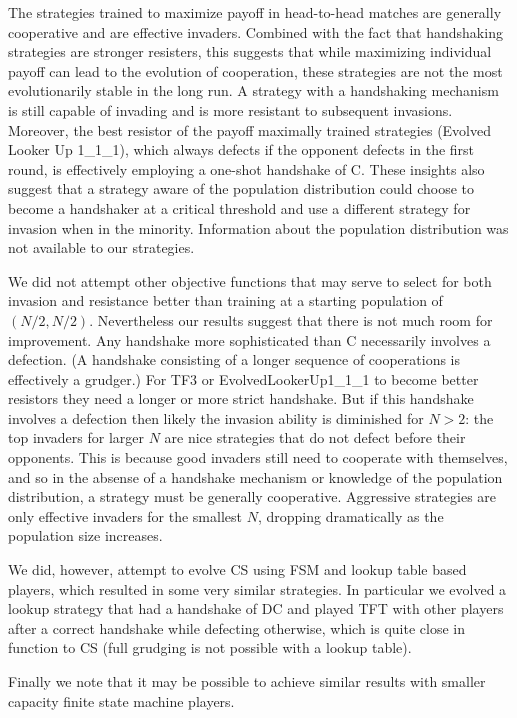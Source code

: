 \documentclass{article}
\begin{document}
The strategies trained to maximize payoff in head-to-head matches are generally
cooperative and are effective invaders.
Combined with the fact that handshaking strategies are stronger resisters,
this suggests that while maximizing individual payoff can lead to the evolution
of cooperation, these strategies are not the most evolutionarily stable
in the long run. A strategy with a handshaking mechanism is still capable of
invading and is more resistant to subsequent invasions. Moreover, the
best resistor of the payoff maximally trained strategies (Evolved Looker Up
1\_1\_1),
which always defects if the opponent defects in the first round, is effectively
employing a one-shot handshake of C. These insights also suggest that a strategy
aware of the population distribution could choose to become a handshaker at
a critical threshold and use a different strategy for invasion when in the
minority. Information about the population distribution was not available
to our strategies.

We did not attempt other objective functions that may serve to select for both
invasion and resistance better than training at a starting population of
$(N/2, N/2)$. Nevertheless our results suggest that there is not much room for
improvement. Any handshake more sophisticated than C necessarily involves
a defection. (A handshake consisting of a longer sequence of cooperations is
effectively a grudger.) For TF3 or EvolvedLookerUp1\_1\_1 to become better resistors
they need a longer or more strict handshake. But if this handshake involves
a defection then likely the invasion ability is diminished for $N > 2$: the top
invaders for larger $N$ are nice strategies that do not defect before their
opponents. This is because good invaders still need to cooperate with themselves,
and so in the absense of a handshake mechanism or knowledge of the population
distribution, a strategy must be generally cooperative. Aggressive strategies
are only effective invaders for the smallest $N$, dropping dramatically
as the population size increases.

We did, however, attempt to evolve CS using FSM and lookup table based players,
which resulted in some very similar strategies. In particular we evolved a
lookup strategy that had a handshake of DC and played TFT with other players
after a correct handshake while defecting otherwise, which is quite close in
function to CS (full grudging is not possible with a lookup table).

Finally we note that it may be possible to achieve similar results with smaller
capacity finite state machine players.
\end{document}
